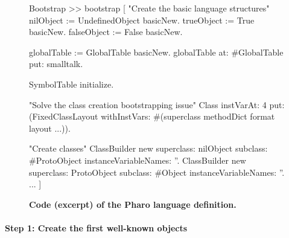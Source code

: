 \begin{figure}[ht]
\begin{code}
Bootstrap >> bootstrap [
    "Create the basic language structures"
    nilObject := UndefinedObject basicNew.
    trueObject := True basicNew.
    falseObject := False basicNew.
    
    globalTable := GlobalTable basicNew.
    globalTable at: #GlobalTable put: smalltalk.
    
    SymbolTable initialize.
    
    "Solve the class creation bootstrapping issue"
    Class
        instVarAt: 4
        put: (FixedClassLayout
            withInstVars: #(superclass methodDict format layout ...)).
    
    "Create classes"
    ClassBuilder new
        superclass: nilObject
        subclass: #ProtoObject
        instanceVariableNames: ''.
    ClassBuilder new
        superclass: ProtoObject
        subclass: #Object
        instanceVariableNames: ''.
    ...
]
\end{code}
\caption{\textbf{Code (excerpt) of the Pharo language definition.}\label{code:process}}
\end{figure}



%

\paragraph{\textbf{Step 1: Create the first well-known objects}}\label{sec:create_nil}


